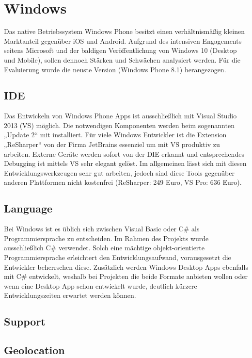 \section{Windows}

Das native Betriebssystem Windows Phone besitzt einen verhältnismäßig kleinen Marktanteil gegenüber iOS und Android. Aufgrund des intensiven Engagements seitens Microsoft und der baldigen Veröffentlichung von Windows 10 (Desktop und Mobile), sollen dennoch Stärken und Schwächen analysiert werden. Für die Evaluierung wurde die neuste Version (Windows Phone 8.1) herangezogen.

\subsection{IDE}

Das Entwickeln von Windows Phone Apps ist ausschließlich mit Visual Studio 2013 (VS) möglich. Die notwendigen Komponenten werden beim sogenannten „Update 2“ mit installiert. Für viele Windows Entwickler ist die Extension „ReSharper“ von der Firma JetBrains essenziel um mit VS produktiv zu arbeiten. Externe Geräte werden sofort von der DIE erkannt und entsprechendes Debugging ist mittels VS sehr elegant gelöst. Im allgemeinen lässt sich mit diesen Entwicklungswerkzeugen sehr gut arbeiten, jedoch sind diese Tools gegenüber anderen Plattformen nicht kostenfrei (ReSharper: 249 Euro, VS Pro: 636 Euro).

\subsection{Language}

Bei Windows ist es üblich sich zwischen Visual Basic oder C# als Programmiersprache zu entscheiden. Im Rahmen des Projekts wurde ausschließlich C# verwendet. Solch eine mächtige objekt-orientierte Programmiersprache erleichtert den Entwicklungsaufwand, vorausgesetzt die Entwickler beherrschen diese. Zusätzlich werden Windows Desktop Apps ebenfalls mit C# entwickelt, weshalb bei Projekten die beide Formate anbieten wollen oder wenn eine Desktop App schon entwickelt wurde, deutlich kürzere Entwicklungszeiten erwartet werden können.

\subsection{Support}

\subsection{Geolocation}

